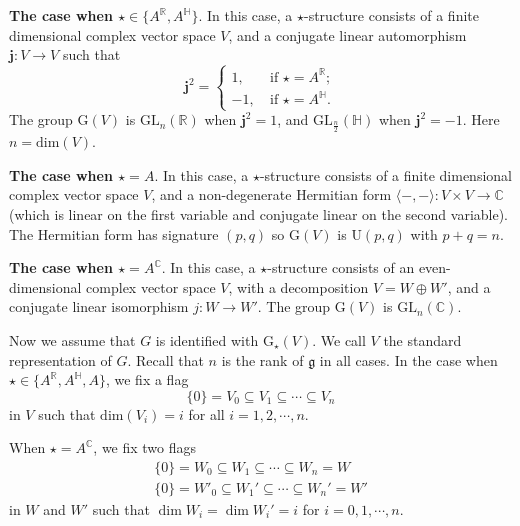 \documentclass[12pt, a4paper]{amsart}
\numberwithin{equation}{section}
\newcommand{\BC}{{\mathbb {C}}}
\newcommand{\BH}{{\mathbb {H}}}
\newcommand{\BR}{{\mathbb {R}}}
\newcommand{\fg}{\mathfrak{g}}
\newcommand{\GL}{{\mathrm{GL}}}
\newcommand{\G}{{\mathrm{G}}}
\newcommand{\U}{{\mathrm{U}}}
\begin{document}
   \textbf{The case when $\star \in \{A^{\BR},A^{\BH}\}$}. In this case, a $\star$-structure consists of a finite dimensional complex vector space $V$, and a conjugate linear automorphism $\mathbf{j}: V \to V$ such that
   $$\mathbf{j}^2 = \left\{
   \begin{aligned}
    1 , & \  \textrm{if $\star = A^{\BR}$}; \\
      -1, & \  \textrm{if $\star = A^{\BH}$}.
   \end{aligned}
   \right.$$
   The group $\G(V)$ is $\GL_n(\BR)$ when $\mathbf{j}^2 = 1$, and $\GL_{\frac{n}{2}}(\BH)$ when $\mathbf{j}^2 = -1$. Here $n = \mathrm{dim}(V)$.

   \textbf{The case when $\star = A$}. In this case, a $\star$-structure consists of a finite dimensional complex vector space $V$, and a non-degenerate Hermitian form $\langle -,- \rangle : V \times V \to \BC$ (which is linear on the first variable and conjugate linear on the second variable). The Hermitian form has signature $(p,q)$ so $\G(V)$ is $\U(p,q)$ with $p+q=n$.

    \textbf{The case when $\star = A^\BC$}. In this case, a $\star$-structure consists of an even-dimensional complex vector space
    $V$, with a decomposition $V = W \oplus W'$, and a conjugate linear isomorphism $j: W \to W'$. The group $\G(V)$ is $\GL_n(\BC)$.

   Now we assume that $G$ is identified with $\G_{\star}(V)$. We call $V$ the standard representation of $G$. Recall that $n$ is the rank of $\fg$ in all cases. 
   In the case when $\star \in \{A^\BR,A^\BH,A\}$, we fix a flag
\begin{equation}\label{flag}
   \{0\} = V_0 \subseteq V_1 \subseteq \cdots \subseteq V_n
\end{equation}
in $V$ such that $\mathrm{dim}(V_i) = i$ for all $i = 1,2,\cdots,n$.

When $\star = A^\BC$, we fix two flags
\begin{align}
    \{0\} = W_0 \subseteq W_1 \subseteq \cdots \subseteq W_n = W \\
    \{0\} = W'_0 \subseteq W_1' \subseteq \cdots \subseteq W_n' = W'
\end{align}
in $W$ and $W'$ such that $\dim W_i = \dim W_i' = i$ for $i = 0, 1, \cdots ,n$.
\end{document}
